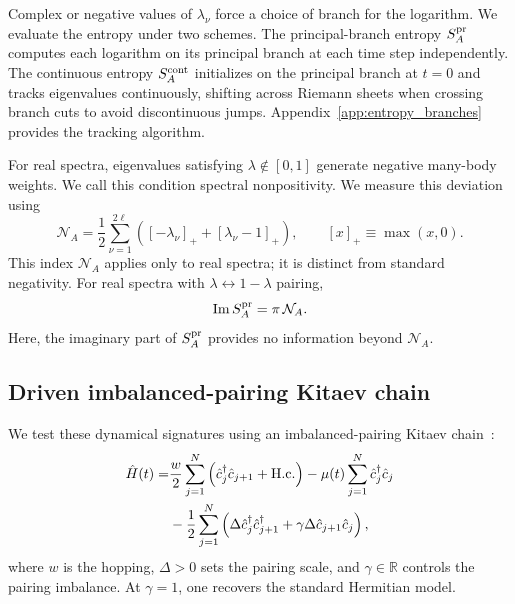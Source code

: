 \documentclass[aps,prb,reprint,superscriptaddress,amsmath,amssymb,floatfix]{revtex4-2}
\begin{document}
Complex or negative values of $\lambda_\nu$ force a choice of branch for the logarithm. We evaluate the entropy under two schemes. The principal-branch entropy $S_A^{\rm pr}$ computes each logarithm on its principal branch at each time step independently. The continuous entropy $S_A^{\rm cont}$ initializes on the principal branch at $t=0$ and tracks eigenvalues continuously, shifting across Riemann sheets when crossing branch cuts to avoid discontinuous jumps. Appendix~\ref{app:entropy_branches} provides the tracking algorithm.

  For real spectra, eigenvalues satisfying $\lambda\notin[0,1]$ generate negative many-body weights. We call this condition spectral nonpositivity. We measure this deviation using
\begin{equation}
\mathcal N_A = \frac{1}{2} \sum_{\nu=1}^{2\ell} \left( [-\lambda_\nu]_+ + [\lambda_\nu-1]_+ \right), \qquad [x]_+\equiv\max(x,0).
\label{eq:general_nonpositivity}
\end{equation}
This index $\mathcal N_A$ applies only to real spectra; it is distinct from standard negativity. For real spectra with $\lambda\leftrightarrow1-\lambda$ pairing,
\begin{equation}
\operatorname{Im}S_A^{\rm pr} = \pi\,\mathcal N_A .
\label{eq:ImS_nonpositivity}
\end{equation}
Here, the imaginary part of $S_A^{\rm pr}$ provides no information beyond $\mathcal N_A$.

\subsection{Driven imbalanced-pairing Kitaev chain}
\label{sec:kitaev_model}

We test these dynamical signatures using an imbalanced-pairing Kitaev chain~\cite{Kitaev2001,Li2018}:
\begin{equation}
\begin{aligned}
\hat H(t)=& \frac{w}{2}\sum_{j=1}^{N} \left(\hat c_j^\dagger \hat c_{j+1}+{\rm H.c.}\right) -\mu(t)\sum_{j=1}^{N}\hat c_j^\dagger \hat c_j \\ &-\frac{1}{2}\sum_{j=1}^{N} \left( \Delta \hat c_j^\dagger \hat c_{j+1}^\dagger +\gamma\Delta \hat c_{j+1}\hat c_j \right),
\end{aligned} \label{eq:Hreal}
\end{equation}
where $w$ is the hopping, $\Delta>0$ sets the pairing scale, and $\gamma\in\mathbb{R}$ controls the pairing imbalance. At $\gamma=1$, one recovers the standard Hermitian model.
\end{document}
